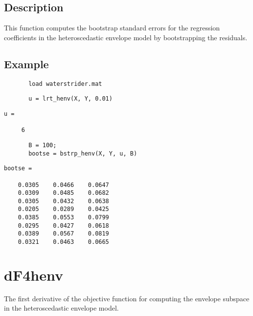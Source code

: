 \documentclass[a4paper,11pt,openany]{memoir}
\begin{document}
\subsection*{Description}

\begin{par}
This function computes the bootstrap standard errors for the regression coefficients in the heteroscedastic envelope model by bootstrapping the residuals.
\end{par} \vspace{1em}


\subsection*{Example}


\begin{verbatim}       load waterstrider.mat\end{verbatim}
    
\begin{verbatim}       u = lrt_henv(X, Y, 0.01)\end{verbatim}
        \color{lightgray}\ttfamily \begin{verbatim}
u =

     6        
\end{verbatim} \rmfamily
\color{black}
\begin{verbatim}       
       B = 100;
       bootse = bstrp_henv(X, Y, u, B)\end{verbatim}
    
        \color{lightgray}\ttfamily \begin{verbatim}
bootse =

    0.0305    0.0466    0.0647
    0.0309    0.0485    0.0682
    0.0305    0.0432    0.0638
    0.0205    0.0289    0.0425
    0.0385    0.0553    0.0799
    0.0295    0.0427    0.0618
    0.0389    0.0567    0.0819
    0.0321    0.0463    0.0665

\end{verbatim} \rmfamily
\color{black}

\newpage


    
\rmfamily
\color{black}\section{dF4henv}

\begin{par}
The first derivative of the objective function for computing the envelope subspace in the heteroscedastic envelope model.
\end{par} \vspace{1em}
\end{document}
